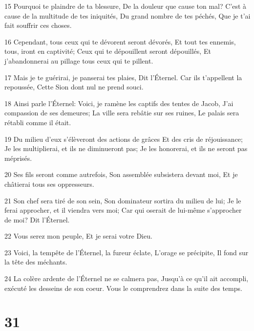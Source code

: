 \par 15 Pourquoi te plaindre de ta blessure, De la douleur que cause ton mal? C'est à cause de la multitude de tes iniquités, Du grand nombre de tes péchés, Que je t'ai fait souffrir ces choses.
\par 16 Cependant, tous ceux qui te dévorent seront dévorés, Et tout tes ennemis, tous, iront en captivité; Ceux qui te dépouillent seront dépouillés, Et j'abandonnerai au pillage tous ceux qui te pillent.
\par 17 Mais je te guérirai, je panserai tes plaies, Dit l'Éternel. Car ils t'appellent la repoussée, Cette Sion dont nul ne prend souci.
\par 18 Ainsi parle l'Éternel: Voici, je ramène les captifs des tentes de Jacob, J'ai compassion de ses demeures; La ville sera rebâtie sur ses ruines, Le palais sera rétabli comme il était.
\par 19 Du milieu d'eux s'élèveront des actions de grâces Et des cris de réjouissance; Je les multiplierai, et ils ne diminueront pas; Je les honorerai, et ils ne seront pas méprisés.
\par 20 Ses fils seront comme autrefois, Son assemblée subsistera devant moi, Et je châtierai tous ses oppresseurs.
\par 21 Son chef sera tiré de son sein, Son dominateur sortira du milieu de lui; Je le ferai approcher, et il viendra vers moi; Car qui oserait de lui-même s'approcher de moi? Dit l'Éternel.
\par 22 Vous serez mon peuple, Et je serai votre Dieu.
\par 23 Voici, la tempête de l'Éternel, la fureur éclate, L'orage se précipite, Il fond sur la tête des méchants.
\par 24 La colère ardente de l'Éternel ne se calmera pas, Jusqu'à ce qu'il ait accompli, exécuté les desseins de son coeur. Vous le comprendrez dans la suite des temps.

\chapter{31}

